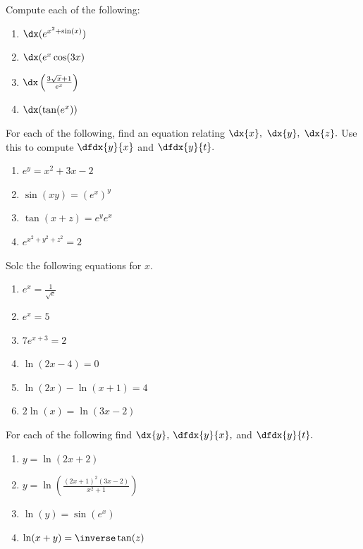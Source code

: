 \begin{ProblemSection}
  \begin{embeddedproblem}{}
    Compute each of the following:
    \begin{enumerate}[label={\bf{}(\alph*)}]{}
    \item $\dx(e^{x^2+\sin(x)})$
    \item $\dx(e^{x}\cos(3x)$
    \item $\dx
      \left(
        \frac{3\sqrt{x}+1}{e^x}
      \right)$
    \item $\dx(\tan(e^x))$
    \end{enumerate}{}
  \end{embeddedproblem}

  \begin{embeddedproblem}{}
    For each of the    following, find an equation relating $\dx{x},$
    $\dx{y},$  $\dx{z}.$ Use this to compute $\dfdx{y}{x}$  and
    $\dfdx{y}{t}.$
    \begin{enumerate}[label={\bf{}(\alph*)}]{}
    \item $e^y=x^2+3x-2$
    \item $\sin(xy)=(e^x)^y$
    \item $\tan(x+z)=e^ye^x$
    \item $e^{x^2+y^2+z^2}=2$
    \end{enumerate}
  \end{embeddedproblem}
\end{ProblemSection}

\begin{ProblemSection}
  \begin{embeddedproblem}{}
    Solc the following equations for $x.$
    \begin{enumerate}[label={\bf{}(\alph*)}]{}
    \item $e^x=\frac{1}{\sqrt{e}}$
    \item $e^x=5$
    \item $7e^{x+3}=2$
    \item $\ln(2x-4)=0$
    \item $\ln(2x)-\ln(x+1)=4$
    \item $2\ln(x)=\ln(3x-2)$
    \end{enumerate}
  \end{embeddedproblem}
  \begin{embeddedproblem}{}
    For each of the following find $\dx{y},$ $\dfdx{y}{x},$ and
    $\dfdx{y}{t}.$
    \begin{enumerate}[label={\bf{}(\alph*)}]{}
    \item $y=\ln(2x+2)$
    \item $y=\ln
      \left(
        \frac{(2x+1)^2(3x-2)}{x^2+1}
      \right)$  
    \item $\ln(y)=\sin(e^x)$
    \item $\ln(x+y)=\inverse\tan(z)$
    \end{enumerate}
  \end{embeddedproblem}
\end{ProblemSection}

